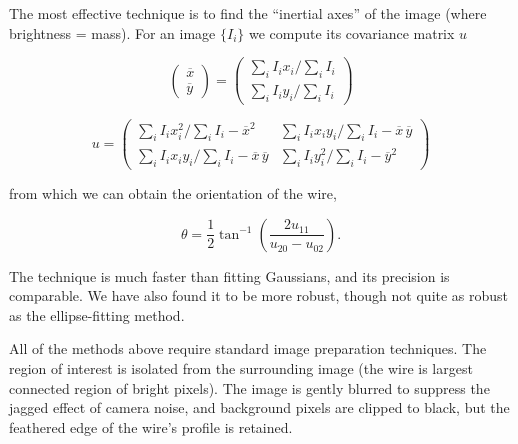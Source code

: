 The most effective technique is to find the ``inertial axes'' of the image (where brightness = mass). For an image $\{I_i\}$ we compute its covariance matrix $u$

\begin{equation}
\left( \begin{array}{c}
\overline{x} \\
\overline{y} \end{array} \right)
= \left( \begin{array}{c}
\sum_{i} I_i x_i / \sum_i I_i \\
\sum_{i} I_i y_i / \sum_i I_i \end{array} \right)
\end{equation}

\begin{equation}
u = \left( \begin{array}{cc}
\sum_{i} I_i x_i^2 / \sum_i I_i - \overline{x}^2 & \sum_{i} I_i x_i y_i / \sum_i I_i - \overline{x}\,\overline{y} \\
\sum_{i} I_i x_i y_i / \sum_i I_i - \overline{x}\,\overline{y} & \sum_{i} I_i y_i^2 / \sum_i I_i - \overline{y}^2\end{array} \right)
\end{equation}

\noindent from which we can obtain the orientation of the wire,

\begin{equation}
\theta = \frac{1}{2}\tan^{-1}\left(\frac{2u_{11}}{u_{20} - u_{02}}\right).
\end{equation}

\noindent The technique is much faster than fitting Gaussians, and its precision is comparable. We have also found it to be more robust, though not quite as robust as the ellipse-fitting method.

All of the methods above require standard image preparation techniques. The region of interest is isolated from the surrounding image (the wire is largest connected region of bright pixels). The image is gently blurred to suppress the jagged effect of camera noise, and background pixels are clipped to black, but the feathered edge of the wire's profile is retained.